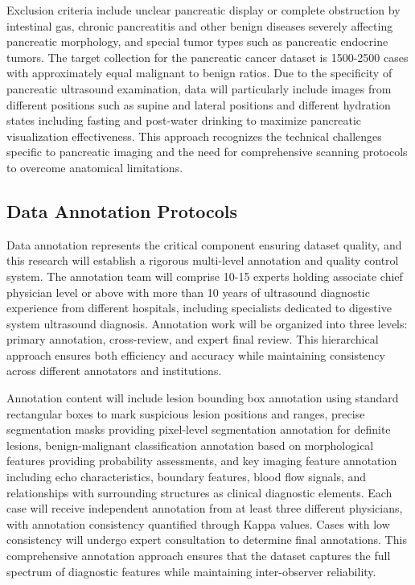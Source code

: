 Exclusion criteria include unclear pancreatic display or complete obstruction by intestinal gas, chronic pancreatitis and other benign diseases severely affecting pancreatic morphology, and special tumor types such as pancreatic endocrine tumors. The target collection for the pancreatic cancer dataset is 1500-2500 cases with approximately equal malignant to benign ratios. Due to the specificity of pancreatic ultrasound examination, data will particularly include images from different positions such as supine and lateral positions and different hydration states including fasting and post-water drinking to maximize pancreatic visualization effectiveness. This approach recognizes the technical challenges specific to pancreatic imaging and the need for comprehensive scanning protocols to overcome anatomical limitations.

\subsection{Data Annotation Protocols}

Data annotation represents the critical component ensuring dataset quality, and this research will establish a rigorous multi-level annotation and quality control system. The annotation team will comprise 10-15 experts holding associate chief physician level or above with more than 10 years of ultrasound diagnostic experience from different hospitals, including specialists dedicated to digestive system ultrasound diagnosis. Annotation work will be organized into three levels: primary annotation, cross-review, and expert final review. This hierarchical approach ensures both efficiency and accuracy while maintaining consistency across different annotators and institutions.

Annotation content will include lesion bounding box annotation using standard rectangular boxes to mark suspicious lesion positions and ranges, precise segmentation masks providing pixel-level segmentation annotation for definite lesions, benign-malignant classification annotation based on morphological features providing probability assessments, and key imaging feature annotation including echo characteristics, boundary features, blood flow signals, and relationships with surrounding structures as clinical diagnostic elements. Each case will receive independent annotation from at least three different physicians, with annotation consistency quantified through Kappa values. Cases with low consistency will undergo expert consultation to determine final annotations. This comprehensive annotation approach ensures that the dataset captures the full spectrum of diagnostic features while maintaining inter-observer reliability.


